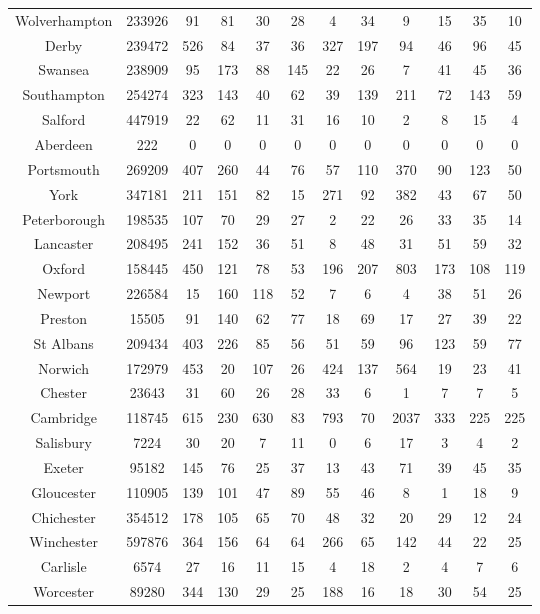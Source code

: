 \begin{tabular}{c|ccccccccccc}
Wolverhampton & 233926 & 91 & 81 & 30 & 28 & 4 & 34 & 9 & 15 & 35 & 10 \\
Derby & 239472 & 526 & 84 & 37 & 36 & 327 & 197 & 94 & 46 & 96 & 45 \\
Swansea & 238909 & 95 & 173 & 88 & 145 & 22 & 26 & 7 & 41 & 45 & 36 \\
Southampton & 254274 & 323 & 143 & 40 & 62 & 39 & 139 & 211 & 72 & 143 & 59 \\
Salford & 447919 & 22 & 62 & 11 & 31 & 16 & 10 & 2 & 8 & 15 & 4 \\
Aberdeen & 222 & 0 & 0 & 0 & 0 & 0 & 0 & 0 & 0 & 0 & 0 \\
Portsmouth & 269209 & 407 & 260 & 44 & 76 & 57 & 110 & 370 & 90 & 123 & 50 \\
York & 347181 & 211 & 151 & 82 & 15 & 271 & 92 & 382 & 43 & 67 & 50 \\
Peterborough & 198535 & 107 & 70 & 29 & 27 & 2 & 22 & 26 & 33 & 35 & 14 \\
Lancaster & 208495 & 241 & 152 & 36 & 51 & 8 & 48 & 31 & 51 & 59 & 32 \\
Oxford & 158445 & 450 & 121 & 78 & 53 & 196 & 207 & 803 & 173 & 108 & 119 \\
Newport & 226584 & 15 & 160 & 118 & 52 & 7 & 6 & 4 & 38 & 51 & 26 \\
Preston & 15505 & 91 & 140 & 62 & 77 & 18 & 69 & 17 & 27 & 39 & 22 \\
St Albans & 209434 & 403 & 226 & 85 & 56 & 51 & 59 & 96 & 123 & 59 & 77 \\
Norwich & 172979 & 453 & 20 & 107 & 26 & 424 & 137 & 564 & 19 & 23 & 41 \\
Chester & 23643 & 31 & 60 & 26 & 28 & 33 & 6 & 1 & 7 & 7 & 5 \\
Cambridge & 118745 & 615 & 230 & 630 & 83 & 793 & 70 & 2037 & 333 & 225 & 225 \\
Salisbury & 7224 & 30 & 20 & 7 & 11 & 0 & 6 & 17 & 3 & 4 & 2 \\
Exeter & 95182 & 145 & 76 & 25 & 37 & 13 & 43 & 71 & 39 & 45 & 35 \\
Gloucester & 110905 & 139 & 101 & 47 & 89 & 55 & 46 & 8 & 1 & 18 & 9 \\
Chichester & 354512 & 178 & 105 & 65 & 70 & 48 & 32 & 20 & 29 & 12 & 24 \\
Winchester & 597876 & 364 & 156 & 64 & 64 & 266 & 65 & 142 & 44 & 22 & 25 \\
Carlisle & 6574 & 27 & 16 & 11 & 15 & 4 & 18 & 2 & 4 & 7 & 6 \\
Worcester & 89280 & 344 & 130 & 29 & 25 & 188 & 16 & 18 & 30 & 54 & 25 \\

\end{tabular}
